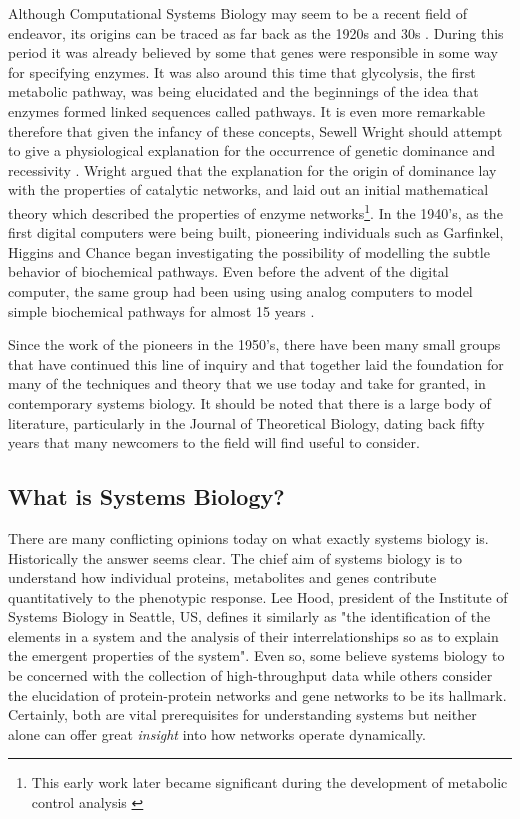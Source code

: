\documentclass[12pt]{article}
\begin{document}
Although Computational Systems Biology may seem to be a recent
field of endeavor, its origins can be traced as far back as the
1920s and 30s \cite{Wright1929}. During this period it was already
believed by some that genes were responsible in some way for
specifying enzymes. It was also around this time that glycolysis,
the first metabolic pathway, was being elucidated and the
beginnings of the idea that enzymes formed linked sequences called
pathways. It is even more remarkable therefore that given the
infancy of these concepts, Sewell Wright should attempt to give a
physiological explanation for the occurrence of genetic dominance
and recessivity \cite{Wright1934}. Wright argued that the
explanation for the origin of dominance lay with the properties of
catalytic networks, and laid out an initial mathematical theory
which described the properties of enzyme networks\footnote{This
early work later became significant during the development of
metabolic control analysis \cite{KB81}}. In the 1940's, as the
first digital computers were being built, pioneering individuals such as
Garfinkel, Higgins and Chance began investigating the possibility of
modelling the subtle behavior of biochemical pathways. Even before the
advent of the digital computer, the same group had been using using
analog computers to model simple biochemical pathways for almost 15 years \cite{Ga61,Hi59,Chance1943}.

Since the work of the pioneers in the 1950's, there have been many
small groups that have continued this line of inquiry and that
together laid the foundation for many of the techniques and
theory that we use today and take for granted, in contemporary
systems biology. It should be noted that there is a large body of
literature, particularly in the Journal of Theoretical Biology,
dating back fifty years that many newcomers to the field will find
useful to consider.

\subsection{What is Systems Biology?}

There are many conflicting opinions today on what exactly systems
biology is. Historically the answer seems clear. The chief aim of
systems biology is to understand how individual proteins,
metabolites and genes contribute quantitatively to the phenotypic
response. Lee Hood, president of the Institute of Systems Biology
in Seattle, US, defines it similarly as "the identification of the
elements in a system and the analysis of their interrelationships
so as to explain the emergent properties of the system". Even so,
some believe systems biology to be concerned with the collection
of high-throughput data while others consider the elucidation of
protein-protein networks and gene networks to be its hallmark.
Certainly, both are vital prerequisites for understanding systems
but neither alone can offer great {\em insight} into how networks
operate dynamically.
\end{document}
